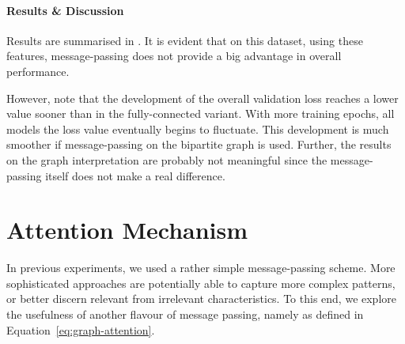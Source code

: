 \documentclass[
	fontsize=10pt, %
	twoside=false, %
	secnumdepth=1, %
  toc=indentunnumbered %
]{kaobook}
\begin{document}
\paragraph{Results \& Discussion} Results are summarised in
. It is evident that on this dataset,
using these features, message-passing does not provide a big
advantage in overall performance.

However, note that the development of the overall validation loss reaches a
lower value sooner than in the fully-connected variant. With more training
epochs, all models the loss value eventually begins to fluctuate. This
development is much smoother if message-passing on the bipartite graph is used.
Further, the results on the graph interpretation are probably not meaningful
since the message-passing itself does not make a real difference.






\section{Attention Mechanism}

In previous experiments, we used a rather simple message-passing scheme. More
sophisticated approaches are potentially able to capture more complex patterns,
or better discern relevant from irrelevant characteristics. To this end, we
explore the usefulness of another flavour of message passing, namely  as defined in Equation~\ref{eq:graph-attention}.


\end{document}
